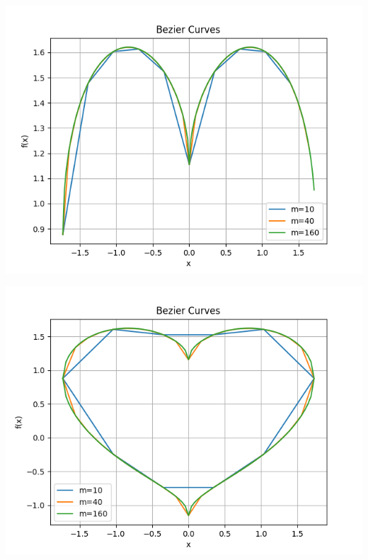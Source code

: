 \documentclass[a4paper]{article}
\begin{document}
    \begin{minipage}{0.45\textwidth}
        \centering
        \includegraphics[width=\textwidth]{Report_figure/figure_F_incorrect.png}
    \end{minipage}
    \hfill
    \begin{minipage}{0.45\textwidth}
        \centering
        \includegraphics[width=\textwidth]{Report_figure/figure_F.png}
    \end{minipage}




\subsection*{  }
\printbibliography
\end{document}
